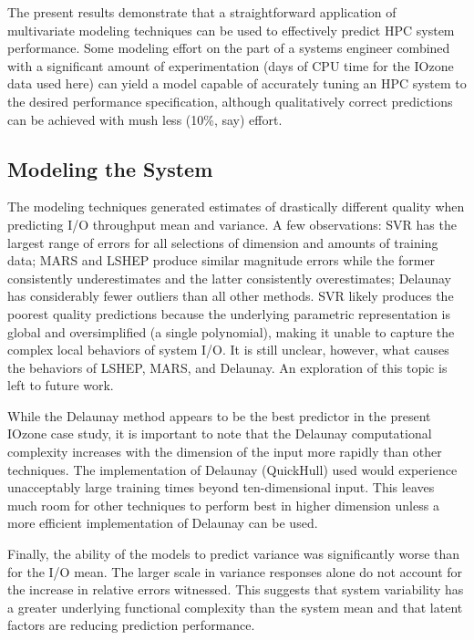 \documentclass{scspaperproc}
\theoremstyle{scsthe}
\begin{document}
The present results demonstrate that a straightforward application of
multivariate modeling techniques can be used to effectively predict
HPC system performance. Some modeling effort on the part of a systems
engineer combined with a significant amount of experimentation (days
of CPU time for the IOzone data used here) can yield a model capable
of accurately tuning an HPC system to the desired performance
specification, although qualitatively correct predictions can be
achieved with mush less (10\%, say) effort.

\vspace{-10pt}
\subsection{Modeling the System}
\vspace{-10pt}
The modeling techniques generated estimates of drastically different
quality when predicting I/O throughput mean and variance. A few
observations: SVR has the largest range of errors for all selections
of dimension and amounts of training data; MARS and LSHEP produce
similar magnitude errors while the former consistently underestimates
and the latter consistently overestimates; Delaunay has considerably
fewer outliers than all other methods. SVR likely produces the poorest
quality predictions because the underlying parametric representation
is global and oversimplified (a single polynomial), making it unable
to capture the complex local behaviors of system I/O. It is still
unclear, however, what causes the behaviors of LSHEP, MARS, and
Delaunay. An exploration of this topic is left to future work.

While the Delaunay method appears to be the best predictor in the
present IOzone case study, it is important to note that the Delaunay
computational complexity increases with the dimension of the input
more rapidly than other techniques. The implementation of Delaunay
(QuickHull) used would experience unacceptably large training times
beyond ten-dimensional input. This leaves much room for other
techniques to perform best in higher dimension unless a more efficient
implementation of Delaunay can be used.

Finally, the ability of the models to predict variance was
significantly worse than for the I/O mean. The larger scale in
variance responses alone do not account for the increase in relative
errors witnessed. This suggests that system variability has a greater
underlying functional complexity than the system mean and that latent
factors are reducing prediction performance.
\end{document}
